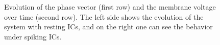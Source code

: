 \documentclass[12pt,a4paper]{article}
\begin{document}
\begin{figure}[H]
	\caption{Evolution of the phase vector (first row) and the membrane voltage over time (second row). The left side shows the evolution of the system with resting ICs, and on the right one can see the behavior under spiking ICs.}
	\label{subfigrinzel} 
\end{figure}
\end{document}

